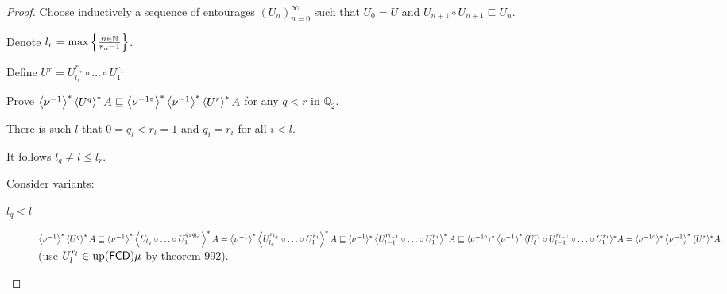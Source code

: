 \begin{proof}
Choose inductively a sequence of entourages $(U_n)_{n = 0}^{\infty}$ such that
$U_0 = U$ and $U_{n + 1} \circ U_{n + 1} \sqsubseteq U_n$.

Denote $l_r = \max \left\{ \frac{ n \in \mathbb{N} }{ r_n = 1 }\right\}$.

Define $U^r = U_{l_r}^{r_{l_r}} \circ \ldots \circ U_1^{r_1}$

Prove $\left\langle \nu^{- 1}\right\rangle ^{\ast} \left\langle U^q\right\rangle ^{\ast} A
\sqsubseteq \left\langle \nu^{- 1 \circ}\right\rangle ^{\ast} \left\langle \nu^{- 1}\right\rangle ^{\ast}
\left\langle U^r\right\rangle ^{\ast} A$ for any $q < r$ in
$\mathbb{Q}_2$. 

There is such $l$ that $0 = q_l < r_l = 1$ and $q_i = r_i$ for all $i < l$.

It follows $l_q \neq l \leq l_r$.

Consider variants:
\begin{description}
  \item[$l_q < l$] $\left\langle \nu^{- 1}\right\rangle ^{\ast} \left\langle U^q\right\rangle ^{\ast} A \sqsubseteq \left\langle \nu^{- 1}\right\rangle ^{\ast} \left\langle
  U_{l_q} \circ \ldots \circ U_1^{q_1q_{l_q}} \right\rangle^{\ast} A = \left\langle \nu^{- 1}\right\rangle ^{\ast} \left\langle U_{l_q}^{r_{l_q}} \circ \ldots \circ
  U_1^{r_1} \right\rangle^{\ast} A \sqsubseteq \langle \nu^{- 1}
  \rangle^{\ast} \left\langle U_{l - 1}^{r_{l - 1}} \circ \ldots \circ
  U_1^{r_1} \right\rangle^{\ast} A \sqsubseteq \langle \nu^{- 1 \circ}
  \rangle^{\ast} \left\langle \nu^{- 1}\right\rangle ^{\ast} \langle U_l^{r_l} \circ U_{l
  - 1}^{r_{l - 1}} \circ \ldots \circ U_1^{r_1} \rangle^{\ast} A = \langle
  \nu^{- 1 \circ} \rangle^{\ast} \left\langle \nu^{- 1}\right\rangle ^{\ast} \langle U^r
  \rangle^{\ast} A$ (use $U_l^{r_l} \in \operatorname{up} (\mathsf{FCD})
  \mu$ by theorem 992).
  

\end{description}
\end{proof}
